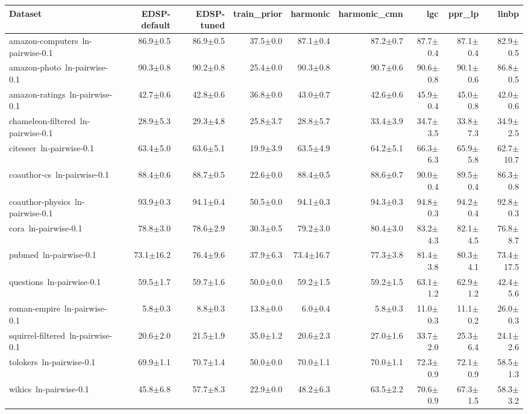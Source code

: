\begin{tabular}{lrrrrrrrr}
\toprule
Dataset & EDSP-default & EDSP-tuned & train\_prior & harmonic & harmonic\_cmn & lgc & ppr\_lp & linbp \\
\midrule
amazon-computers~ln-pairwise-0.1 & 86.9$\pm$0.5 & 86.9$\pm$0.5 & 37.5$\pm$0.0 & 87.1$\pm$0.4 & 87.2$\pm$0.7 & 87.7$\pm$0.4 & 87.1$\pm$0.4 & 82.9$\pm$0.5 \\
amazon-photo~ln-pairwise-0.1 & 90.3$\pm$0.8 & 90.2$\pm$0.8 & 25.4$\pm$0.0 & 90.3$\pm$0.8 & 90.7$\pm$0.6 & 90.6$\pm$0.8 & 90.1$\pm$0.6 & 86.8$\pm$0.5 \\
amazon-ratings~ln-pairwise-0.1 & 42.7$\pm$0.6 & 42.8$\pm$0.6 & 36.8$\pm$0.0 & 43.0$\pm$0.7 & 42.6$\pm$0.6 & 45.9$\pm$0.4 & 45.0$\pm$0.8 & 42.0$\pm$0.6 \\
chameleon-filtered~ln-pairwise-0.1 & 28.9$\pm$5.3 & 29.3$\pm$4.8 & 25.8$\pm$3.7 & 28.8$\pm$5.7 & 33.4$\pm$3.9 & 34.7$\pm$3.5 & 33.8$\pm$7.3 & 34.9$\pm$2.5 \\
citeseer~ln-pairwise-0.1 & 63.4$\pm$5.0 & 63.6$\pm$5.1 & 19.9$\pm$3.9 & 63.5$\pm$4.9 & 64.2$\pm$5.1 & 66.3$\pm$6.3 & 65.9$\pm$5.8 & 62.7$\pm$10.7 \\
coauthor-cs~ln-pairwise-0.1 & 88.4$\pm$0.6 & 88.7$\pm$0.5 & 22.6$\pm$0.0 & 88.4$\pm$0.5 & 88.6$\pm$0.7 & 90.0$\pm$0.4 & 89.5$\pm$0.4 & 86.3$\pm$0.8 \\
coauthor-physics~ln-pairwise-0.1 & 93.9$\pm$0.3 & 94.1$\pm$0.4 & 50.5$\pm$0.0 & 94.1$\pm$0.3 & 94.3$\pm$0.3 & 94.8$\pm$0.3 & 94.2$\pm$0.4 & 92.8$\pm$0.3 \\
cora~ln-pairwise-0.1 & 78.8$\pm$3.0 & 78.6$\pm$2.9 & 30.3$\pm$0.5 & 79.2$\pm$3.0 & 80.4$\pm$3.0 & 83.2$\pm$4.3 & 82.1$\pm$4.5 & 76.8$\pm$8.7 \\
pubmed~ln-pairwise-0.1 & 73.1$\pm$16.2 & 76.4$\pm$9.6 & 37.9$\pm$6.3 & 73.4$\pm$16.7 & 77.3$\pm$3.8 & 81.4$\pm$3.8 & 80.3$\pm$4.1 & 73.4$\pm$17.5 \\
questions~ln-pairwise-0.1 & 59.5$\pm$1.7 & 59.7$\pm$1.6 & 50.0$\pm$0.0 & 59.2$\pm$1.5 & 59.2$\pm$1.5 & 63.1$\pm$1.2 & 62.9$\pm$1.2 & 42.4$\pm$5.6 \\
roman-empire~ln-pairwise-0.1 & 5.8$\pm$0.3 & 8.8$\pm$0.3 & 13.8$\pm$0.0 & 6.0$\pm$0.4 & 5.8$\pm$0.3 & 11.0$\pm$0.3 & 11.1$\pm$0.2 & 26.0$\pm$0.3 \\
squirrel-filtered~ln-pairwise-0.1 & 20.6$\pm$2.0 & 21.5$\pm$1.9 & 35.0$\pm$1.2 & 20.6$\pm$2.3 & 27.0$\pm$1.6 & 33.7$\pm$2.0 & 25.3$\pm$6.4 & 24.1$\pm$2.6 \\
tolokers~ln-pairwise-0.1 & 69.9$\pm$1.1 & 70.7$\pm$1.4 & 50.0$\pm$0.0 & 70.0$\pm$1.1 & 70.0$\pm$1.1 & 72.3$\pm$0.9 & 72.1$\pm$0.9 & 58.5$\pm$1.3 \\
wikics~ln-pairwise-0.1 & 45.8$\pm$6.8 & 57.7$\pm$8.3 & 22.9$\pm$0.0 & 48.2$\pm$6.3 & 63.5$\pm$2.2 & 70.6$\pm$0.9 & 67.3$\pm$1.5 & 58.3$\pm$3.2 \\
\bottomrule
\end{tabular}
